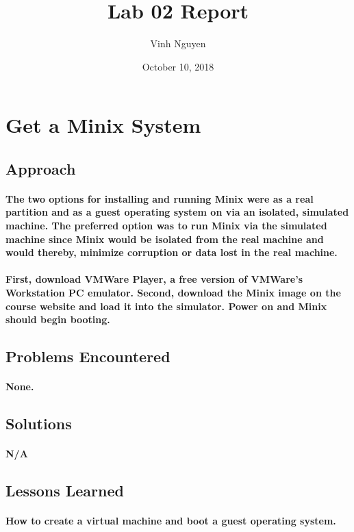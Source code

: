 \documentclass[12pt, oneside, a4paper]{article}
\begin{document}
\title{Lab 02 Report}
\author{Vinh Nguyen}
\date{October 10, 2018}
\maketitle
\newpage

\section{Get a Minix System}
	\subsection*{Approach}
		\paragraph{
			The two options for installing and running Minix were as a real partition and
			as a guest operating system on via an isolated, simulated machine.  The
			preferred option was to run Minix via the simulated machine since Minix
			would be isolated from the real machine and would thereby, minimize
			corruption or data lost in the real machine.
		}
		\paragraph{
			First, download VMWare Player, a free version of VMWare's Workstation PC
			emulator.  Second, download the Minix image on the course website and load
			it into the simulator.  Power on and Minix should begin booting.
		}
	\subsection*{Problems Encountered}
		\paragraph{
			None.
		}
	\subsection*{Solutions}
		\paragraph{
			N/A
		}
	\subsection*{Lessons Learned}
		\paragraph{
			How to create a virtual machine and boot a guest operating system.
		}
\newpage
\end{document}
